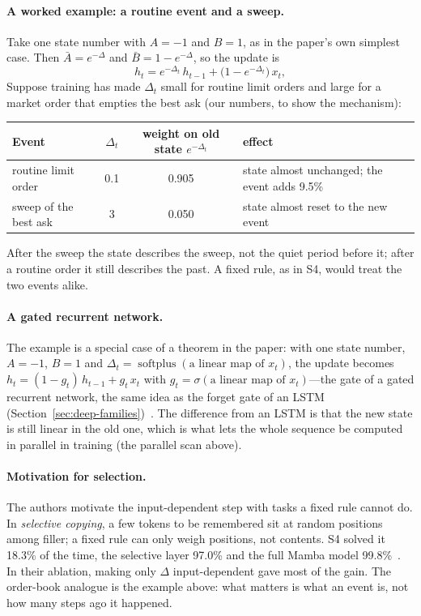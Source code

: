 \paragraph{A worked example: a routine event and a sweep.} Take one state number with $A = -1$ and $B = 1$, as in the
paper's own simplest case. Then $\bar{A} = e^{-\Delta}$ and $\bar{B} = 1 - e^{-\Delta}$, so the update is
\[
  h_t = e^{-\Delta_t}\, h_{t-1} + \big(1 - e^{-\Delta_t}\big)\, x_t ,
\]
Suppose training has made $\Delta_t$ small for routine limit orders and large for a market order that empties the
best ask (our numbers, to show the mechanism):
\begin{center}\footnotesize
\begin{tabular}{lccl}
\toprule
Event & $\Delta_t$ & weight on old state $e^{-\Delta_t}$ & effect \\
\midrule
routine limit order & 0.1 & 0.905 & state almost unchanged; the event adds 9.5\% \\
sweep of the best ask & 3 & 0.050 & state almost reset to the new event \\
\bottomrule
\end{tabular}
\end{center}
After the sweep the state describes the sweep, not the quiet period before it; after a routine order it still
describes the past. A fixed rule, as in S4, would treat the two events alike.

\paragraph{A gated recurrent network.} The example is a special case of a theorem in the paper: with one state number, $A = -1$,
$B = 1$ and $\Delta_t = \operatorname{softplus}(\text{a linear map of } x_t)$, the update becomes
$h_t = (1 - g_t)\,h_{t-1} + g_t\,x_t$ with $g_t = \sigma(\text{a linear map of } x_t)$---the gate of a gated recurrent
network, the same idea as the forget gate of an LSTM (Section~\ref{sec:deep-families})~\citep{gu2024mamba}. The
difference from an LSTM is that the new state is still linear in the old one, which is what lets the whole sequence be
computed in parallel in training (the parallel scan above).

\paragraph{Motivation for selection.} The authors motivate the input-dependent step with tasks a fixed rule cannot do. In
\emph{selective copying}, a few tokens to be remembered sit at random positions among filler; a fixed rule can only
weigh positions, not contents. S4 solved it 18.3\% of the time, the selective layer 97.0\% and the full Mamba
model 99.8\%~\citep{gu2024mamba}. In their ablation, making only $\Delta$ input-dependent gave most of the gain. The
order-book analogue is the example above: what matters is what an event is, not how many steps ago it happened.

